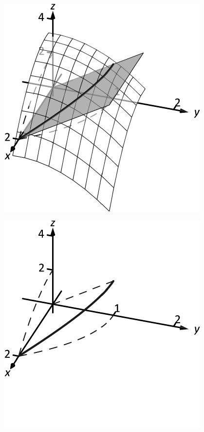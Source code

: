 \documentclass[10pt]{article}
\begin{document}
\includegraphics{fig3d_proj_3DBW.pdf}
\texttt{}

\includegraphics{fig3d_projb_3DBW.pdf}
\texttt{}
\end{document}
